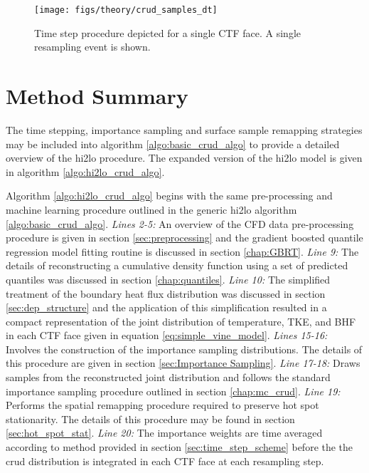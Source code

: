 \begin{figure}[H]
    \centering
    \texttt{[image: figs/theory/crud\_samples\_dt]}
    \caption[Time step procedure depicted for a single CTF face]{Time step procedure depicted for a single CTF face.  A single resampling event is shown.}
    \label{fig:crudsamplesdt}
\end{figure}

\section{Method Summary}

The time stepping, importance sampling and surface sample remapping strategies may be included into algorithm \ref{algo:basic_crud_algo} to provide a detailed overview of the hi2lo procedure.  The expanded version of the hi2lo model is given in algorithm \ref{algo:hi2lo_crud_algo}.

Algorithm \ref{algo:hi2lo_crud_algo} begins with the same pre-processing and machine learning procedure outlined in the generic hi2lo algorithm \ref{algo:basic_crud_algo}.  \emph{Lines 2-5:} An overview of the CFD data pre-processing procedure is given in section \ref{sec:preprocessing} and the gradient boosted quantile regression model fitting routine is discussed in section \ref{chap:GBRT}.  \emph{Line 9:} The details of reconstructing a cumulative density function using a set of predicted quantiles was discussed in section \ref{chap:quantiles}.  \emph{Line 10:} The simplified treatment of the boundary heat flux distribution was discussed in section \ref{sec:dep_structure} and the application of this simplification resulted in a compact representation of the joint distribution of temperature, TKE, and BHF in each CTF face given in equation \ref{eq:simple_vine_model}.   \emph{Lines 15-16:} Involves the construction of the importance sampling distributions.  The details of this procedure are given in section \ref{sec:Importance Sampling}.   \emph{Line 17-18:} Draws samples from the reconstructed joint distribution and follows the standard importance sampling procedure outlined in section \ref{chap:mc_crud}.  \emph{Line 19:} Performs the spatial remapping procedure required to preserve hot spot stationarity.  The details of this procedure may be found in section \ref{sec:hot_spot_stat}.  \emph{Line 20:} The importance weights are time averaged according to method provided in section \ref{sec:time_step_scheme} before the the crud distribution is integrated in each CTF face at each resampling step.


